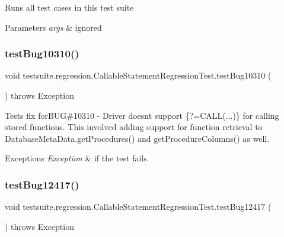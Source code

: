 Runs all test cases in this test suite


\begin{DoxyParams}{Parameters}
{\em args} & ignored \\
\hline
\end{DoxyParams}
\mbox{\label{classtestsuite_1_1regression_1_1_callable_statement_regression_test_a8cd92a05056f0d180cf2d2f9f68bea36}} 
\subsubsection{\texorpdfstring{test\+Bug10310()}{testBug10310()}}
{\footnotesize\ttfamily void testsuite.\+regression.\+Callable\+Statement\+Regression\+Test.\+test\+Bug10310 (\begin{DoxyParamCaption}{ }\end{DoxyParamCaption}) throws Exception}

Tests fix for\+B\+UG\#10310 -\/ Driver doesn\textquotesingle{}t support \{?=C\+A\+LL(...)\} for calling stored functions. This involved adding support for function retrieval to Database\+Meta\+Data.\+get\+Procedures() and get\+Procedure\+Columns() as well.


\begin{DoxyExceptions}{Exceptions}
{\em Exception} & if the test fails. \\
\hline
\end{DoxyExceptions}
\mbox{\label{classtestsuite_1_1regression_1_1_callable_statement_regression_test_a94871dee0acb2b3df8de40559b08d32d}} 
\subsubsection{\texorpdfstring{test\+Bug12417()}{testBug12417()}}
{\footnotesize\ttfamily void testsuite.\+regression.\+Callable\+Statement\+Regression\+Test.\+test\+Bug12417 (\begin{DoxyParamCaption}{ }\end{DoxyParamCaption}) throws Exception}

